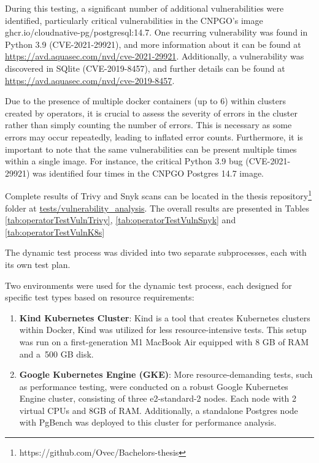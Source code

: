 During this testing, a significant number of additional vulnerabilities were identified, particularly critical vulnerabilities in the CNPGO's image ghcr.io/cloudnative-pg/postgresql:14.7. One recurring vulnerability was found in Python 3.9 (CVE-2021-29921), and more information about it can be found at \url{https://avd.aquasec.com/nvd/cve-2021-29921}. Additionally, a vulnerability was discovered in SQlite (CVE-2019-8457), and further details can be found at \url{https://avd.aquasec.com/nvd/cve-2019-8457}.

Due to the presence of multiple docker containers (up to 6) within clusters created by operators, it is crucial to assess the severity of errors in the cluster rather than simply counting the number of errors. This is necessary as some errors may occur repeatedly, leading to inflated error counts. Furthermore, it is important to note that the same vulnerabilities can be present multiple times within a single image. For instance, the critical Python 3.9 bug (CVE-2021-29921) was identified four times in the CNPGO Postgres 14.7 image.

Complete results of Trivy and Snyk scans can be located in the thesis repository\footnote[6]{https://github.com/Ovec/Bachelors-thesis} folder at \url{tests/vulnerability_analysis}. The overall results are presented in Tables \ref{tab:operatorTestVulnTrivy}, \ref{tab:operatorTestVulnSnyk} and \ref{tab:operatorTestVulnK8s}


The dynamic test process was divided into two separate subprocesses, each with its own
test plan.

Two environments were used for the dynamic test process, each designed for specific test types based on resource requirements:

\begin{enumerate}
    \item \textbf{Kind Kubernetes Cluster}: Kind is a tool that creates Kubernetes clusters within Docker, Kind was utilized for less resource-intensive tests. This setup was run on a first-generation M1 MacBook Air equipped with 8 GB of RAM and a 500 GB disk.
    \item \textbf{Google Kubernetes Engine (GKE)}: More resource-demanding tests, such as performance testing, were conducted on a robust Google Kubernetes Engine cluster, consisting of three e2-standard-2 nodes. Each node with 2 virtual CPUs and 8GB of RAM. Additionally, a standalone Postgres node with PgBench was deployed to this cluster for performance analysis.
\end{enumerate}

